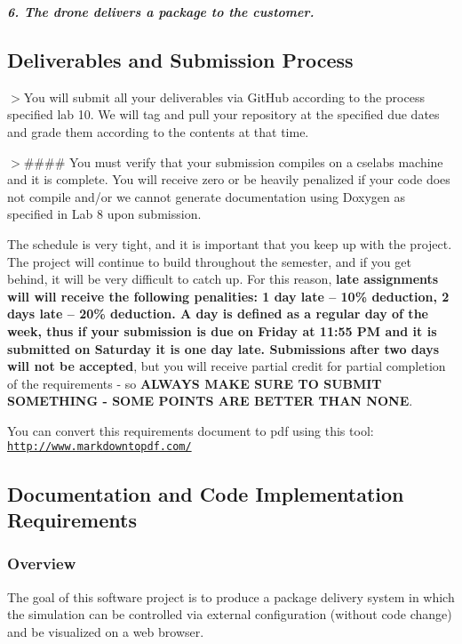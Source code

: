 {\itshape {\bfseries 6. The drone delivers a package to the customer.}}

\subsection*{Deliverables and Submission Process}

$>$You will submit all your deliverables via Git\+Hub according to the process specified lab 10. We will tag and pull your repository at the specified due dates and grade them according to the contents at that time.

$>$\#\#\#\# You must verify that your submission compiles on a cselabs machine and it is complete. You will receive zero or be heavily penalized if your code does not compile and/or we cannot generate documentation using Doxygen as specified in Lab 8 upon submission.

The schedule is very tight, and it is important that you keep up with the project. The project will continue to build throughout the semester, and if you get behind, it will be very difficult to catch up. For this reason, {\bfseries late assignments will will receive the following penalities\+: 1 day late -- 10\% deduction, 2 days late -- 20\% deduction. A day is defined as a regular day of the week, thus if your submission is due on Friday at 11\+:55 PM and it is submitted on Saturday it is one day late. Submissions after two days will not be accepted}, but you will receive partial credit for partial completion of the requirements -\/ so {\bfseries A\+L\+W\+A\+YS M\+A\+KE S\+U\+RE TO S\+U\+B\+M\+IT S\+O\+M\+E\+T\+H\+I\+NG -\/ S\+O\+ME P\+O\+I\+N\+TS A\+RE B\+E\+T\+T\+ER T\+H\+AN N\+O\+NE}.

You can convert this requirements document to pdf using this tool\+: \href{http://www.markdowntopdf.com/}{\tt http\+://www.\+markdowntopdf.\+com/}





\subsection*{Documentation and Code Implementation Requirements}

\subsubsection*{Overview}

The goal of this software project is to produce a package delivery system in which the simulation can be controlled via external configuration (without code change) and be visualized on a web browser.

